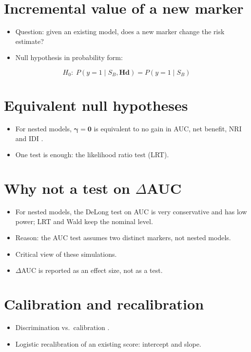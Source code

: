 \label{ch:framework}

\section{Incremental value of a new marker}
\begin{itemize}
    \item Question: given an existing model, does a new marker change the risk estimate? \cite{cook_quantifying_2018}
    \item Null hypothesis in probability form:
\end{itemize}
\begin{equation}
    H_0:\; P\left(y = 1 \mid S_B, \mathbf{Hd}\right) = P\left(y = 1 \mid S_B\right)
\end{equation}

\section{Equivalent null hypotheses}
\begin{itemize}
    \item For nested models, $\boldsymbol{\gamma}=\mathbf{0}$ is equivalent to no gain in AUC, net benefit, NRI and IDI \cite{pepe_testing_2013}.
    \item One test is enough: the likelihood ratio test (LRT).
\end{itemize}

\section{Why not a test on $\Delta$AUC}
\begin{itemize}
    \item For nested models, the DeLong test on AUC is very conservative and has low power; LRT and Wald keep the nominal level. 
    \item Reason: the AUC test assumes two distinct markers, not nested models. 
    \item Critical view of these simulations. 
    \item $\Delta$AUC is reported as an effect size, not as a test.
\end{itemize}

\section{Calibration and recalibration}
\begin{itemize}
    \item Discrimination vs.\ calibration \cite{alba_discrimination_2017}. 
    \item Logistic recalibration of an existing score: intercept and slope. 
\end{itemize}

